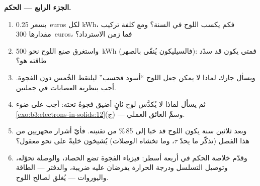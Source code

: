 \begin{problem}
\medskip\noindent\textbf{الجزء الرابع --- الحكم.}

\begin{enumerate}[resume]
  \item بسعر \qty{0.25}{euros} لكل \unit{kWh}، فكم يكسب اللوح
        في السنة؟ ومع كلفة تركيب مقدارها \qty{300}{euros}،
        فما زمن الاسترداد؟
  \item واستغرق صنع اللوح نحو \qty{500}{kWh}
        (فالسيليكون يُنقّى بالصهر): فمتى يكون قد سدّد طاقته هو؟
  \item ويسأل جارك لماذا لا يمكن جعل اللوح
        ``أسود فحسب'' ليلتقط الخُمس دون الفجوة. أجب
        بنظرية العصابات في جملتين.
  \item ثم يسأل لماذا لا يُكدَّس لوح ثانٍ أضيق فجوةً
        تحته: أجب على ضوء
        \cref{exo:b3:electrons-in-solids:12}(ج) --- وسمِّ
        العائق العملي.
  \item وبعد ثلاثين سنة يكون اللوح قد خبا إلى 85\,\% من
        تقنينه. فأيّ أشرار مجهريين من هذا الفصل
        (تذكّر ما يحدّ $\tau$، وما تخشاه الوصلات)
        يُشيخون خليةً على نحو معقول؟
  \item وقدّم خلاصة الحكم في أربعة أسطر: فيزياء الفجوة
        تضع الحصاد، والوصلة تحوّله، وتوصيل
        التسلسل ودرجة الحرارة يفرضان عليه ضريبة، والدفتر --- الطاقة
        واليوروات --- يُغلق لصالح اللوح.
\end{enumerate}
\end{problem}
